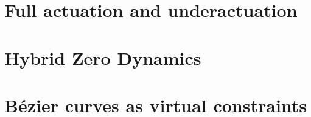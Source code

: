 \section{Full actuation and underactuation} \label{sec:underactuatedMaths}


\section{Hybrid Zero Dynamics}

\pagebreak

\section{B{\'e}zier curves as virtual constraints}
